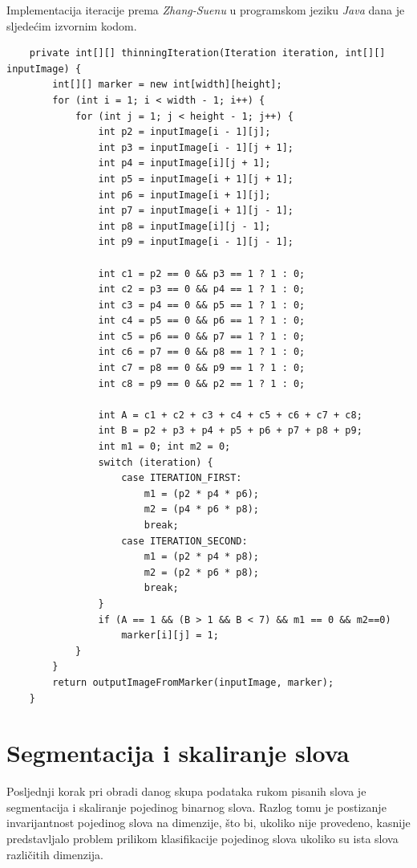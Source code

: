 Implementacija iteracije prema \emph{Zhang-Suenu} u programskom jeziku \emph{Java} dana je sljedećim izvornim kodom.
\lstset{language=Java, tabsize=2}
\begin{lstlisting}
    private int[][] thinningIteration(Iteration iteration, int[][] inputImage) {
        int[][] marker = new int[width][height];
        for (int i = 1; i < width - 1; i++) {
            for (int j = 1; j < height - 1; j++) {
                int p2 = inputImage[i - 1][j];
                int p3 = inputImage[i - 1][j + 1];
                int p4 = inputImage[i][j + 1];
                int p5 = inputImage[i + 1][j + 1];
                int p6 = inputImage[i + 1][j];
                int p7 = inputImage[i + 1][j - 1];
                int p8 = inputImage[i][j - 1];
                int p9 = inputImage[i - 1][j - 1];

                int c1 = p2 == 0 && p3 == 1 ? 1 : 0;
                int c2 = p3 == 0 && p4 == 1 ? 1 : 0;
                int c3 = p4 == 0 && p5 == 1 ? 1 : 0;
                int c4 = p5 == 0 && p6 == 1 ? 1 : 0;
                int c5 = p6 == 0 && p7 == 1 ? 1 : 0;
                int c6 = p7 == 0 && p8 == 1 ? 1 : 0;
                int c7 = p8 == 0 && p9 == 1 ? 1 : 0;
                int c8 = p9 == 0 && p2 == 1 ? 1 : 0;

                int A = c1 + c2 + c3 + c4 + c5 + c6 + c7 + c8;
                int B = p2 + p3 + p4 + p5 + p6 + p7 + p8 + p9;
                int m1 = 0; int m2 = 0;
                switch (iteration) {
                    case ITERATION_FIRST:
                        m1 = (p2 * p4 * p6);
                        m2 = (p4 * p6 * p8);
                        break;
                    case ITERATION_SECOND:
                        m1 = (p2 * p4 * p8);
                        m2 = (p2 * p6 * p8);
                        break;
                }
                if (A == 1 && (B > 1 && B < 7) && m1 == 0 && m2==0)
                    marker[i][j] = 1;
            }
        }
        return outputImageFromMarker(inputImage, marker);
    }
\end{lstlisting}

\section{Segmentacija i skaliranje slova}

Posljednji korak pri obradi danog skupa podataka rukom pisanih slova je segmentacija i skaliranje pojedinog binarnog slova. Razlog tomu je postizanje invarijantnost pojedinog slova na dimenzije, što bi, ukoliko nije provedeno, kasnije predstavljalo problem prilikom klasifikacije pojedinog slova ukoliko su ista slova različitih dimenzija.

